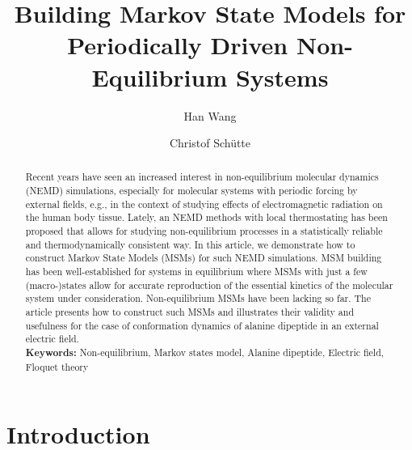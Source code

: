 \documentclass[journal=jctcce,manuscript=article]{achemso}
\title{Building Markov State Models for Periodically Driven Non-Equilibrium Systems}
\author{Han Wang}
\affiliation{CAEP Software Center for High Performance Numerical Simulation, Beijing, China}
\author{Christof Sch\"utte}
\affiliation{Institute for Mathematics, Freie Universit\"at Berlin, Germany}
\begin{document}
   
\begin{abstract}
Recent years have seen an increased interest in non-equilibrium molecular dynamics (NEMD) simulations, especially for molecular systems with periodic forcing by external fields, e.g., in the context of studying  effects of electromagnetic radiation on the human body tissue. Lately, an NEMD methods with local thermostating has been proposed that allows for studying 
non-equilibrium processes in a statistically reliable and thermodynamically consistent way. In this article, we demonstrate how to construct Markov State Models (MSMs) for such NEMD simulations. MSM building has been well-established for systems in equilibrium where MSMs with just a few (macro-)states allow for accurate reproduction of the essential kinetics of the molecular system under consideration. Non-equilibrium MSMs have been lacking so far. The article presents how to construct such MSMs and illustrates their validity and usefulness for the case of conformation dynamics of alanine dipeptide in an external electric field.  \\
\textbf{Keywords:} {Non-equilibrium, Markov states model, Alanine dipeptide, Electric field, Floquet theory}
\end{abstract}


\maketitle

\section{Introduction}
\end{document}
